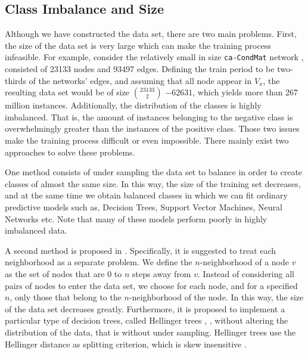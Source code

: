 \documentclass{acm_proc_article-sp}
\begin{document}
\subsection{Class Imbalance and Size}
\label{Sect.2b}
Although we have constructed the data set, there are two main problems. First, the size of the data set is very large which can make the training process infeasible. For example, consider the relatively small in size \texttt{ca-CondMat} network \cite{Leskovec:2007:GED:1217299.1217301}, consisted of 23133 nodes and 93497 edges. Defining the train period to be two-thirds of the networks' edges, and assuming that all node appear in $V_x$, the resulting data set would be of size $23133 \choose 2$ $ - 62631$, which yields more than 267 million instances. Additionally, the distribution of the classes is highly imbalanced. That is, the amount of instances belonging to the negative class is overwhelmingly greater than the instances of  the positive class. Those two issues make the training process difficult or even impossible. There mainly exist two approaches to solve these problems.

One method consists of under sampling the data set to balance in order to create classes of almost the same size. In this way, the size of the training set decreases, and at the same time we obtain balanced classes in which we can fit ordinary predictive models such as, Decision Trees, Support Vector Machines, Neural Networks etc. Note that many of these models perform poorly in highly imbalanced data. 	 

A second method is proposed in \cite{Lichtenwalter:2010:NPM:1835804.1835837}. Specifically, it is suggested to treat each neighborhood as a separate problem. We define the $n$-neighborhood of a node $v$ as the set of nodes that are 0 to $n$ steps away from $v$. Instead of considering all pairs of nodes to enter the data set, we choose for each node, and for a specified $n$, only those that belong to the $n$-neighborhood of the node. In this way, the size of the data set decreases greatly. Furthermore, it is proposed to implement a particular type of decision trees, called Hellinger trees  \cite{Cieslak2008}, \cite{Cieslak2012}, without altering the distribution of the data, that is without under sampling. Hellinger trees use the Hellinger distance as splitting criterion, which is skew insensitive \cite{Cieslak2012}.



\end{document}
